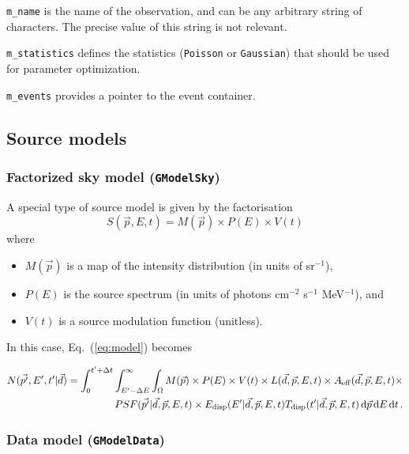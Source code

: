 \documentclass{article}[12pt,a4]
\begin{document}
{\tt m\_name} is the name of the observation, and can be any arbitrary string of
characters.
The precise value of this string is not relevant.

{\tt m\_statistics} defines the statistics ({\tt Poisson} or {\tt Gaussian}) that should be used
for parameter optimization.

{\tt m\_events} provides a pointer to the event container.


\subsection{Source models}

\subsubsection{Factorized sky model ({\tt GModelSky})}

A special type of source model is given by the factorisation
\begin{equation}
S(\vec{p}, E, t) = M(\vec{p}) \times P(E) \times V(t)
\end{equation}
where
\begin{itemize}
\item[] $M(\vec{p})$ is a map of the intensity distribution (in units of sr$^{-1}$),
\item[] $P(E)$ is the source spectrum (in units of photons cm$^{-2}$ s$^{-1}$ MeV$^{-1}$), and
\item[] $V(t)$ is a source modulation function (unitless).
\end{itemize}
In this case, Eq.~(\ref{eq:model}) becomes

\begin{eqnarray}
N(\vec{p'}, E', t' | \vec{d}) = \int_{0}^{t'+\Delta t} \int_{E'-\Delta E}^{\infty} \int_{\Omega} 
M(\vec{p}) \times P(E) \times V(t) \times 
L(\vec{d}, \vec{p}, E, t) \times
A_{\rm eff}(\vec{d}, \vec{p}, E, t) \times \nonumber \\
PSF(\vec{p'} | \vec{d}, \vec{p}, E, t) \times
E_{\rm disp}(E' | \vec{d}, \vec{p}, E, t) 
T_{\rm disp}(t' | \vec{d}, \vec{p}, E, t) 
\, {\rm d}\vec{p} \, {\rm d}E \, {\rm d}t \, .
\end{eqnarray}

\subsubsection{Data model ({\tt GModelData})}
\end{document}
